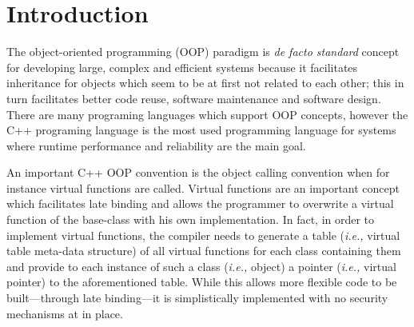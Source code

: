 \section{Introduction}
\label{chapter:Introduction}

The object-oriented programming (OOP) paradigm is \textit{de facto standard} concept for developing large, complex and efficient
systems because it facilitates inheritance for objects which seem to be at first not related to each other; this in turn 
facilitates better code reuse, software maintenance and software design. There are many programing languages
which support OOP concepts, however the C++ programing language is the most used programming language for systems where 
runtime performance and reliability are the main goal.

An important C++ OOP convention is the object calling convention when for instance virtual functions are called.
Virtual functions are an important concept which facilitates late binding and allows the programmer to overwrite a
virtual function of the base-class with his own implementation. In fact, in order to implement virtual functions, 
the compiler needs to generate a table (\textit{i.e.,} virtual table meta-data structure) of all
virtual functions for each class containing them and provide to each instance of such a class (\textit{i.e.,} object) a pointer (\textit{i.e.,} virtual pointer)
to the aforementioned table. While this allows more flexible code to be built---through late binding---it is simplistically implemented with no security
mechanisms at in place.

